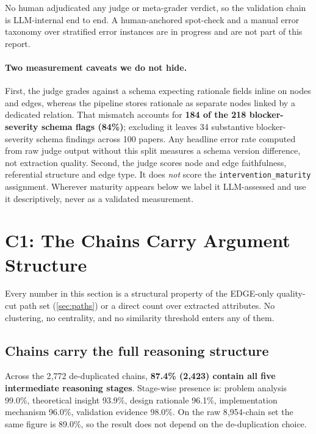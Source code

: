 \documentclass[10pt,twocolumn,letterpaper]{article}
\begin{document}
No human adjudicated any judge or meta-grader verdict, so the validation chain is
LLM-internal end to end. A human-anchored spot-check and a manual error taxonomy over
stratified error instances are in progress and are not part of this report.

\paragraph{Two measurement caveats we do not hide.} First, the judge grades
against a schema expecting rationale fields inline on nodes and edges, whereas
the pipeline stores rationale as separate nodes linked by a dedicated relation.
That mismatch accounts for \textbf{184 of the 218 blocker-severity schema flags
(84\%)}; excluding it leaves 34 substantive blocker-severity schema findings
across 100 papers. Any headline error rate computed from raw judge output without
this split measures a schema version difference, not extraction quality.
Second, the judge scores node and edge faithfulness, referential structure and
edge type. It does \emph{not} score the \texttt{intervention\_maturity}
assignment. Wherever maturity appears below we label it LLM-assessed and use it
descriptively, never as a validated measurement.

\section{C1: The Chains Carry Argument Structure}
\label{sec:claim1}

Every number in this section is a structural property of the EDGE-only
quality-cut path set (\cref{sec:paths}) or a direct count over extracted
attributes. No clustering, no centrality, and no similarity threshold enters any
of them.

\subsection{Chains carry the full reasoning structure}

Across the 2{,}772 de-duplicated chains, \textbf{87.4\% (2{,}423) contain all
five intermediate reasoning stages}. Stage-wise presence is: problem analysis
99.0\%, theoretical insight 93.9\%, design rationale 96.1\%, implementation
mechanism 96.0\%, validation evidence 98.0\%. On the raw 8{,}954-chain set the
same figure is 89.0\%, so the result does not depend on the de-duplication
choice.
\end{document}
